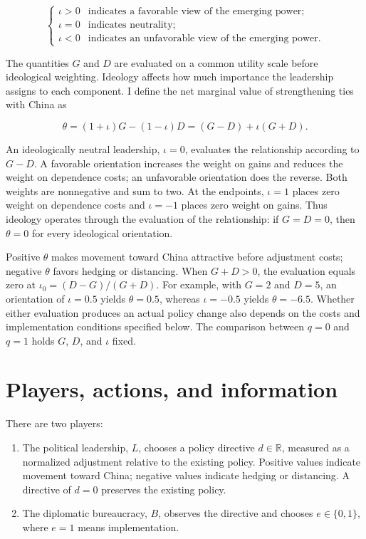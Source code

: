 \documentclass[
  11pt,
]{article}
\providecommand{\tightlist}{%
  \setlength{\itemsep}{0pt}\setlength{\parskip}{0pt}}
\theoremstyle{definition}
\begin{document}
\[
\begin{cases}
\iota>0 & \text{indicates a favorable view of the emerging power;}\\
\iota=0 & \text{indicates neutrality;}\\
\iota<0 & \text{indicates an unfavorable view of the emerging power.}
\end{cases}
\]

The quantities \(G\) and \(D\) are evaluated on a common utility scale
before ideological weighting. Ideology affects how much importance the
leadership assigns to each component. I define the net marginal value of
strengthening ties with China as

\[
\theta=(1+\iota)G-(1-\iota)D
      =(G-D)+\iota(G+D).
\]

An ideologically neutral leadership, \(\iota=0\), evaluates the
relationship according to \(G-D\). A favorable orientation increases the
weight on gains and reduces the weight on dependence costs; an
unfavorable orientation does the reverse. Both weights are nonnegative
and sum to two. At the endpoints, \(\iota=1\) places zero weight on
dependence costs and \(\iota=-1\) places zero weight on gains. Thus
ideology operates through the evaluation of the relationship: if
\(G=D=0\), then \(\theta=0\) for every ideological orientation.

Positive \(\theta\) makes movement toward China attractive before
adjustment costs; negative \(\theta\) favors hedging or distancing. When
\(G+D>0\), the evaluation equals zero at \(\iota_0=(D-G)/(G+D)\). For
example, with \(G=2\) and \(D=5\), an orientation of \(\iota=0.5\)
yields \(\theta=0.5\), whereas \(\iota=-0.5\) yields \(\theta=-6.5\).
Whether either evaluation produces an actual policy change also depends
on the costs and implementation conditions specified below. The
comparison between \(q=0\) and \(q=1\) holds \(G\), \(D\), and \(\iota\)
fixed.

\section{Players, actions, and
information}\label{players-actions-and-information}

There are two players:

\begin{enumerate}
\def\labelenumi{\arabic{enumi}.}
\tightlist
\item
  The political leadership, \(L\), chooses a policy directive
  \(d\in\mathbb{R}\), measured as a normalized adjustment relative to
  the existing policy. Positive values indicate movement toward China;
  negative values indicate hedging or distancing. A directive of \(d=0\)
  preserves the existing policy.
\item
  The diplomatic bureaucracy, \(B\), observes the directive and chooses
  \(e\in\{0,1\}\), where \(e=1\) means implementation.
\end{enumerate}
\end{document}

